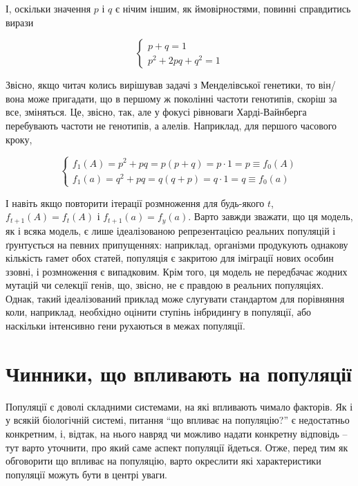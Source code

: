 \documentclass[
  11pt,
]{book}
\begin{document}
І, оскільки значення \(p\) і \(q\) є нічим іншим, як ймовірностями, повинні справдитись вирази

\[
\begin{cases}
p + q = 1 \\
p^2 + 2pq + q^2 = 1
\end{cases}
\]

Звісно, якщо читач колись вирішував задачі з Менделівської генетики, то він/вона може пригадати, що в першому ж поколінні частоти генотипів, скоріш за все, зміняться. Це, звісно, так, але у фокусі рівноваги Харді-Вайнберга перебувають частоти не генотипів, а алелів. Наприклад, для першого часового кроку,

\[
\begin{cases}
f_1(A) = p^2 + pq = p(p + q) = p \cdot 1 = p \equiv f_0(A)\\ 
f_1(a) = q^2 + pq = q(q + p) = q \cdot 1 = q \equiv f_0(a)
\end{cases}
\]

І навіть якщо повторити ітерації розмноження для будь-якого \(t\), \(f_{t+1}(A) = f_t (A)\) і \(f_{t+1}(a) = f_y (a)\). Варто завжди зважати, що ця модель, як і всяка модель, є лише ідеалізованою репрезентацією реальних популяцій і ґрунтується на певних припущеннях: наприклад, організми продукують однакову кількість гамет обох статей, популяція є закритою для іміграції нових особин ззовні, і розмноження є випадковим. Крім того, ця модель не передбачає жодних мутацій чи селекції генів, що, звісно, не є правдою в реальних популяціях. Однак, такий ідеалізований приклад може слугувати стандартом для порівняння коли, наприклад, необхідно оцінити ступінь інбридингу в популяції, або наскільки інтенсивно гени рухаються в межах популяції.

\section{Чинники, що впливають на популяції}\label{pop-factors}

Популяції є доволі складними системами, на які впливають чимало факторів. Як і у всякій біологічній системі, питання ``що впливає на популяцію?'' є недостатньо конкретним, і, відтак, на нього навряд чи можливо надати конкретну відповідь -- тут варто уточнити, про який саме аспект популяції йдеться. Отже, перед тим як обговорити що впливає на популяцію, варто окреслити які характеристики популяції можуть бути в центрі уваги.
\end{document}
